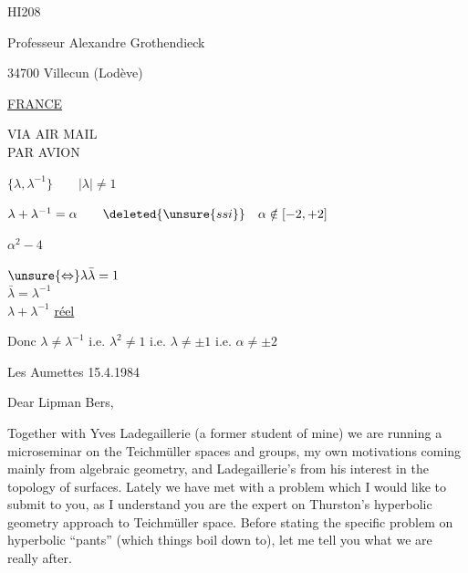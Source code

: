 HI208

Professeur Alexandre Grothendieck

34700 Villecun (Lodève)

\uline{FRANCE}

VIA AIR MAIL\\
PAR AVION



$\{\lambda,\lambda^{-1}\}\qquad |\lambda|\ne1$

$\lambda+\lambda^{-1}=\alpha\qquad\deleted{\unsure{ssi}}\quad\alpha\notin[-2,+2]$

$\alpha^2-4$

$\unsure{\Leftrightarrow}\lambda\bar\lambda=1$\\
$\bar\lambda=\lambda^{-1}$\\
$\lambda+\lambda^{-1}$ \uline{réel}

Donc $\lambda\ne\lambda^{-1}$ i.e. $\lambda^2\ne1$ i.e. $\lambda\ne\pm1$ i.e. $\alpha\ne\pm2$
\begin{flushright}Les Aumettes 15.4.1984\end{flushright}

Dear Lipman Bers,

Together with Yves Ladegaillerie (a former student of mine) we are running a microseminar on the Teichmüller spaces and groups, my own motivations coming mainly from algebraic geometry, and Ladegaillerie's from his interest in the topology of surfaces. Lately we have met with a problem which I would like to submit to you, as I understand you are the  expert on Thurston's hyperbolic geometry approach to Teichmüller space. Before stating the specific problem on hyperbolic ``pants'' (which things boil down to), let me tell you what we are really after.

